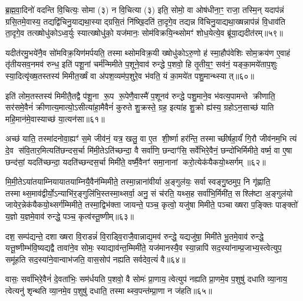 {\anuvakamend[{म॒हि॒मान॒ꣵ॒ स्वाहाप॑हत्या अध्व॒र्युर्धी॑यते॒ चतु॑र्विHशतिश्च॥८॥}]}

ब्र॒ह्म॒वा॒दिनो॑ वदन्ति वि॒चित्यः॒ सोमा (३) न वि॒चित्या (३) इति॒ सोमो॒ वा ओष॑धीना॒ꣳ॒ राजा॒ तस्मि॒न् यदाप॑न्नं ग्रसि॒तमे॒वास्य॒ तद्यद्वि॑चिनु॒याद्यथा॒स्याद्ग्रसि॒तं नि॑ष्खि॒दति॑ ता॒दृगे॒व तद्यन्न वि॑चिनु॒याद्यथा॒ख्षन्नाप॑न्नं वि॒धाव॑ति ता॒दृगे॒व तत्ख्षोधु॑कोऽध्व॒र्युः स्यात्ख्षोधु॑को॒ यज॑मानः॒ सोम॑विक्रयि॒न्थ्सोमꣳ॑ शोध॒येत्ये॒व ब्रू॑या॒द्यदीत॑रम्॥५९॥

यदीत॑रमु॒भये॑नै॒व सो॑मविक्र॒यिण॑मर्पयति॒ तस्माथ्सोमविक्र॒यी ख्षोधु॑कोऽरु॒णो ह॑ स्मा॒हौप॑वेशिः सोम॒क्रय॑ण ए॒वाहं तृ॑तीयसव॒नमव॑ रुन्ध॒ इति॑ पशू॒नां चर्म॑न्मिमीते प॒शूने॒वाव॑ रुन्द्धे प॒शवो॒ हि तृ॒तीय॒ꣳ॒ सव॑नं॒ यङ्का॒मये॑ताप॒शुः स्या॒दित्यृ॑ख्ष॒तस्तस्य॑ मिमीत॒र्ख्षं वा अ॑पश॒व्यम॑प॒शुरे॒व भ॑वति॒ यं का॒मये॑त पशु॒मान्थ्स्यात्॥६०॥

इति॑ लोम॒तस्तस्य॑ मिमीतै॒तद्वै प॑शू॒ना रू॒प रू॒पेणै॒वास्मै॑ प॒शूनव॑ रुन्द्धे पशु॒माने॒व भ॑वत्य॒पामन्ते क्रीणाति॒ सर॑समे॒वैनं॑ क्रीणात्य॒मात्यो॒ऽसीत्या॑हा॒मैवैनं॑ कुरुते शु॒क्रस्ते॒ ग्रह॒ इत्या॑ह शु॒क्रो ह्य॑स्य॒ ग्रहोऽन॒साच्छ॑ याति महि॒मान॑मे॒वास्याच्छ॑ या॒त्यन॑सा॥६१॥

अच्छ॑ याति॒ तस्मा॑दनोवा॒ह्यꣳ॑ स॒मे जीव॑नं॒ यत्र॒ खलु॒ वा ए॒त शी॒र्\mbox{}ष्णा हर॑न्ति॒ तस्माच्छीर्\mbox{}षहा॒र्यं॑ गि॒रौ जीव॑नम॒भि त्यं दे॒व स॑वि॒तार॒मित्यति॑छन्दस॒र्चा मि॑मी॒तेऽति॑च्छन्दा॒ वै सर्वा॑णि॒ छन्दाꣳ॑सि॒ सर्वे॑भिरे॒वैनं॒ छन्दो॑भिर्मिमीते॒ वर्\mbox{}ष्म॒ वा ए॒षा छन्द॑सां॒ यदति॑च्छन्दा॒ यदति॑च्छन्दस॒र्चा मिमी॑ते॒ वर्\mbox{}ष्मै॒वैनꣳ॑ समा॒नानां करो॒त्येक॑यैकयो॒थ्सर्गम्॥६२॥

मि॒मी॒तेऽया॑तयाम्नियायातयाम्नियै॒वैन॑म्मिमीते॒ तस्मा॒न्नाना॑वीर्या अ॒ङ्गुल॑यः॒ सर्वास्वङ्गु॒ष्ठमुप॒ नि गृ॑ह्णाति॒ तस्माथ्स॒माव॑द्वीर्यो॒ऽन्याभि॑र॒ङ्गुलि॑भि॒स्तस्मा॒थ्सर्वा॒ अनु॒ सं च॑रति॒ यथ्स॒ह सर्वा॑भि॒र्मिमी॑त॒ सश्लि॑ष्टा अ॒ङ्गुल॑यो जायेर॒न्नेक॑यैकयो॒थ्सर्ग॑म्मिमीते॒ तस्मा॒द्विभ॑क्ता जायन्ते॒ पञ्च॒ कृत्वो॒ यजु॑षा मिमीते॒ पञ्चाख्षरा प॒ङ्क्तिः पाङ्क्तो॑ य॒ज्ञो य॒ज्ञमे॒वाव॑ रुन्द्धे॒ पञ्च॒ कृत्व॑स्तू॒ष्णीम्॥६३॥

दश॒ सम्प॑द्यन्ते॒ दशाख्षरा वि॒राडन्नं॑ वि॒राड्वि॒राजै॒वान्नाद्य॒मव॑ रुन्द्धे॒ यद्यजु॑षा॒ मिमी॑ते भू॒तमे॒वाव॑ रुन्द्धे॒ यत्तू॒ष्णीम्भ॑वि॒ष्यद्यद्वै तावा॑ने॒व सोमः॒ स्याद्याव॑न्त॒म्मिमी॑ते॒ यज॑मानस्यै॒व स्या॒न्नापि॑ सद॒स्या॑नाम्प्र॒जाभ्य॒स्त्वेत्युप॒ समू॑हति सद॒स्या॑ने॒वान्वाभ॑जति॒ वास॒सोप॑ नह्यति सर्वदेव॒त्यं॑ वै॥६४॥

वासः॒ सर्वा॑भिरे॒वैनं॑ दे॒वता॑भिः॒ सम॑र्धयति प॒शवो॒ वै सोमः॑ प्रा॒णाय॒ त्वेत्युप॑ नह्यति प्रा॒णमे॒व प॒शुषु॑ दधाति व्या॒नाय॒ त्वेत्यनु॑ शृन्थति व्या॒नमे॒व प॒शुषु॑ दधाति॒ तस्माथ्स्व॒पन्त॑म्प्रा॒णा न ज॑हति॥६५॥

